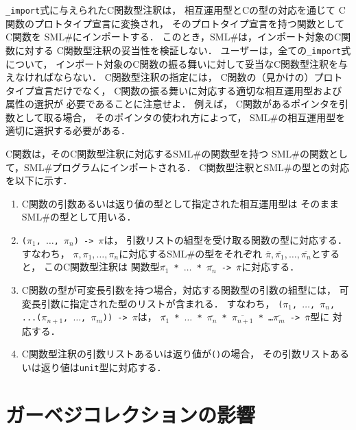 \documentclass{jbook}
\newcommand{\smlsharp}{SML\#}
\begin{document}
	{\tt \_import}式に与えられたC関数型注釈は，
相互運用型とCの型の対応を通じて
C関数のプロトタイプ宣言に変換され，
そのプロトタイプ宣言を持つ関数としてC関数を
\smlsharp{}にインポートする．
	このとき，\smlsharp{}は，インポート対象のC関数に対する
C関数型注釈の妥当性を検証しない．
	ユーザーは，全ての{\tt \_import}式について，
インポート対象のC関数の振る舞いに対して妥当なC関数型注釈を与えなければならない．
	C関数型注釈の指定には，
C関数の（見かけの）プロトタイプ宣言だけでなく，
C関数の振る舞いに対応する適切な相互運用型および属性の選択が
必要であることに注意せよ．
	例えば，
C関数があるポインタを引数として取る場合，
そのポインタの使われ方によって，
\smlsharp{}の相互運用型を適切に選択する必要がある．

	C関数は，そのC関数型注釈に対応する\smlsharp{}の関数型を持つ
\smlsharp{}の関数として，\smlsharp{}プログラムにインポートされる．
	C関数型注釈と\smlsharp{}の型との対応を以下に示す．
\begin{enumerate}
\item
	C関数の引数あるいは返り値の型として指定された相互運用型は
そのまま\smlsharp{}の型として用いる．
\item
	{\tt ($\pi_1$, $\ldots$, $\pi_n$) -> $\pi$}は，
引数リストの組型を受け取る関数の型に対応する．
	すなわち，
$\pi, \pi_1, \ldots, \pi_n$に対応する\smlsharp{}の型をそれぞれ
$\overline{\pi}, \overline{\pi_1}, \ldots, \overline{\pi_n}$とすると，
このC関数型注釈は
関数型{\tt $\overline{\pi_1}$ * $\ldots$ * $\overline{\pi_n}$ -> $\overline{\pi}$}に対応する．
\item
	C関数の型が可変長引数を持つ場合，対応する関数型の引数の組型には，
可変長引数に指定された型のリストが含まれる．
	すなわち，
{\tt ($\pi_1$, $\ldots$, $\pi_n$, ...($\pi_{n+1}$, $\ldots$, $\pi_{m}$)) -> $\pi$}は，
{\tt $\overline{\pi_1}$ * $\ldots$ * $\overline{\pi_n}$ * $\overline{\pi_{n+1}}$ * \ldots * $\overline{\pi_{m}}$ -> $\overline{\pi}$}型に
対応する．
\item
	C関数型注釈の引数リストあるいは返り値が{\tt ()}の場合，
その引数リストあるいは返り値は{\tt unit}型に対応する．
\end{enumerate}


\section{ガーベジコレクションの影響}
\label{sec:gc}
\end{document}
